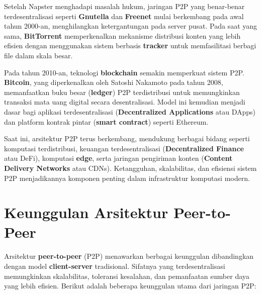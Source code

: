 Setelah Napster menghadapi masalah hukum, jaringan P2P yang benar-benar terdesentralisasi seperti \textbf{Gnutella} dan \textbf{Freenet} mulai berkembang pada awal tahun 2000-an, menghilangkan ketergantungan pada server pusat. Pada saat yang sama, \textbf{BitTorrent} memperkenalkan mekanisme distribusi konten yang lebih efisien dengan menggunakan sistem berbasis \textbf{tracker} untuk memfasilitasi berbagi file dalam skala besar.

Pada tahun 2010-an, teknologi \textbf{blockchain} semakin memperkuat sistem P2P. \textbf{Bitcoin}, yang diperkenalkan oleh Satoshi Nakamoto pada tahun 2008, memanfaatkan buku besar (\textbf{ledger}) P2P terdistribusi untuk memungkinkan transaksi mata uang digital secara desentralisasi. Model ini kemudian menjadi dasar bagi aplikasi terdesentralisasi (\textbf{Decentralized Applications} atau DApps) dan platform kontrak pintar (\textbf{smart contract}) seperti Ethereum.

Saat ini, arsitektur P2P terus berkembang, mendukung berbagai bidang seperti komputasi terdistribusi, keuangan terdesentralisasi (\textbf{Decentralized Finance} atau DeFi), komputasi \textbf{edge}, serta jaringan pengiriman konten (\textbf{Content Delivery Networks} atau CDNs). Ketangguhan, skalabilitas, dan efisiensi sistem P2P menjadikannya komponen penting dalam infrastruktur komputasi modern.


\section{Keunggulan Arsitektur Peer-to-Peer}

Arsitektur \textbf{peer-to-peer} (P2P) menawarkan berbagai keunggulan dibandingkan dengan model \textbf{client-server} tradisional. Sifatnya yang terdesentralisasi memungkinkan skalabilitas, toleransi kesalahan, dan pemanfaatan sumber daya yang lebih efisien. Berikut adalah beberapa keunggulan utama dari jaringan P2P:

